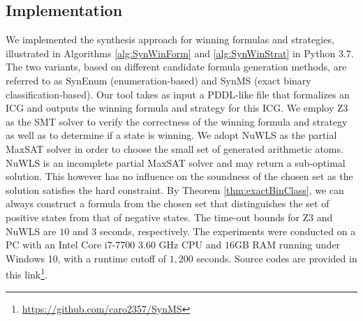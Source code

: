 \documentclass[review]{elsarticle}
\begin{document}
\subsection{Implementation}
We implemented the synthesis approach for winning formulas and strategies, illustrated in Algorithms \ref{alg:SynWinForm} and \ref{alg:SynWinStrat} in Python 3.7.
The two variants, based on different candidate formula generation methods, are referred to as SynEnum (enumeration-based) and SynMS (exact binary classification-based).
Our tool takes as input a PDDL-like file that formalizes an ICG and outputs the winning formula and strategy for this ICG.
We employ Z3 \cite{MouB2008} as the SMT solver to verify the correctness of the winning formula and strategy as well as to determine if a state is winning.
We adopt NuWLS \cite{ChuCL2023} as the partial MaxSAT solver in order to choose the small set of generated arithmetic atoms.
NuWLS is an incomplete partial MaxSAT solver and may return a sub-optimal solution.
This however has no influence on the soundness of the chosen set as the solution satisfies the hard constraint.
By Theorem \ref{thm:exactBinClass}, we can always construct a formula from the chosen set that distinguishes the set of positive states from that of negative states.
The time-out bounds for Z3 and NuWLS are $10$ and $3$ seconds, respectively.
The experiments were conducted on a PC with an Intel Core i7-7700 $3.60$ GHz CPU and $16$GB RAM running under Windows 10, with a runtime cutoff of $1,200$ seconds.
Source codes are provided in this link\footnote{\url{https://github.com/caro2357/SynMS}}.
\end{document}
